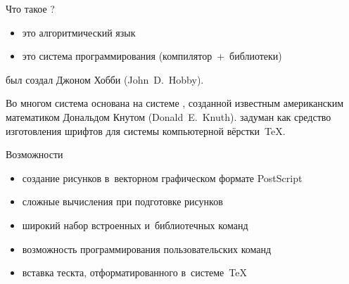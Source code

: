 

\begin{frame}{Что такое ?}
\begin{itemize}
\item
это алгоритмический язык
\item
это система программирования (компилятор~+~библиотеки)
\end{itemize}

 был создал Джоном Хобби (John~D.~Hobby).

Во многом система  основана на системе ,
созданной известным американским математиком Дональдом Кнутом
(Donald~E.~Knuth).  задуман как средство изготовления шрифтов
для системы компьютерной вёрстки \TeX.
\end{frame}


\begin{frame}{Возможности }

\begin{itemize}
\item
создание рисунков в~векторном графическом формате PostScript

\item
сложные вычисления при подготовке рисунков

\item
широкий набор встроенных и~библиотечных команд

\item
возможность программирования пользовательских команд

\item
вставка тескта, отформатированного в~системе~\TeX

\end{itemize}
\end{frame}


